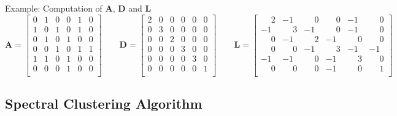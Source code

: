 \begin{frame}{Example: Computation of $\bm{A}$, $\bm{D}$ and $\bm{L}$}{}
	\scriptsize
	\begin{equation*}
		\bm{A} = \begin{bmatrix}
			0 & 1 & 0 & 0 & 1 & 0 \\
			1 & 0 & 1 & 0 & 1 & 0 \\
			0 & 1 & 0 & 1 & 0 & 0 \\
			0 & 0 & 1 & 0 & 1 & 1 \\
			1 & 1 & 0 & 1 & 0 & 0 \\
			0 & 0 & 0 & 1 & 0 & 0 \\
		\end{bmatrix}\qquad
		\bm{D} = \begin{bmatrix}
			2 & 0 & 0 & 0 & 0 & 0 \\
			0 & 3 & 0 & 0 & 0 & 0 \\
			0 & 0 & 2 & 0 & 0 & 0 \\
			0 & 0 & 0 & 3 & 0 & 0 \\
			0 & 0 & 0 & 0 & 3 & 0 \\
			0 & 0 & 0 & 0 & 0 & 1 \\
		\end{bmatrix}\qquad
		\bm{L} = \begin{bmatrix}
			 \phantom{-}2 	& -1 			& \phantom{-}0 	& \phantom{-}0 	& -1 			& \phantom{-}0 	\\
			-1 			& \phantom{-}3 	& -1 			& \phantom{-}0 	& -1 			& \phantom{-}0 	\\
			 \phantom{-}0 	& -1 			& \phantom{-}2 	& -1 			& \phantom{-}0 	& \phantom{-}0 	\\
			 \phantom{-}0 	& \phantom{-}0 	& -1 			& \phantom{-}3 	& -1 			& -1 			\\
			-1 			& -1 			& \phantom{-}0 	& -1 			& \phantom{-}3 	& \phantom{-}0 	\\
			 \phantom{-}0 	& \phantom{-}0 	& \phantom{-}0 	& -1 			& \phantom{-}0 	& \phantom{-}1 	\\
		\end{bmatrix}
	\end{equation*}
\end{frame}


\subsection{Spectral Clustering Algorithm}

